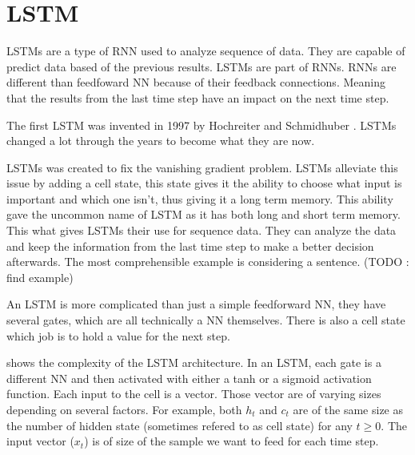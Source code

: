 \section{\acs{LSTM}}\label{sec:lstm}
\acp{LSTM} are a type of \ac{RNN} used to analyze sequence of data. They are capable of predict data based of the previous results. \acp{LSTM} are part of \acp{RNN}. \acp{RNN} are different than feedfoward \acl{NN} because of their feedback connections. Meaning that the results from the last time step have an impact on the next time step.

The first \ac{LSTM} was invented in 1997 by Hochreiter and Schmidhuber \cite{firstLSTM}. \acp{LSTM} changed a lot through the years to become what they are now.

\acp{LSTM} was created to fix the vanishing gradient problem. \acp{LSTM} alleviate this issue by adding a cell state, this state gives it the ability to choose what input is important and which one isn't, thus giving it a long term memory. This ability gave the uncommon name of \acl{LSTM} as it has both long and short term memory. This what gives \acp{LSTM} their use for sequence data. They can analyze the data and keep the information from the last time step to make a better decision afterwards. The most comprehensible example is considering a sentence. (TODO : find example)

An \ac{LSTM} is more complicated than just a simple feedforward \acl{NN}, they have several gates, which are all technically a \ac{NN} themselves. There is also a cell state which job is to hold a value for the next step.

\begin{figure}[H]
  \centering
  \begin{minipage}{\columnwidth}
  \end{minipage}
  \begin{minipage}{\columnwidth}
  \end{minipage}
  \caption{}
\end{figure}

 shows the complexity of the \ac{LSTM} architecture. In an \ac{LSTM}, each gate is a different \ac{NN} and then activated with either a \ac{tanh} or a sigmoid activation function. Each input to the cell is a vector.
Those vector are of varying sizes depending on several factors. For example, both $h_t$ and $c_t$ are of the same size as the number of hidden state (sometimes refered to as cell state) for any $t\geq 0$.
The input vector ($x_t$) is of size of the sample we want to feed for each time step.

